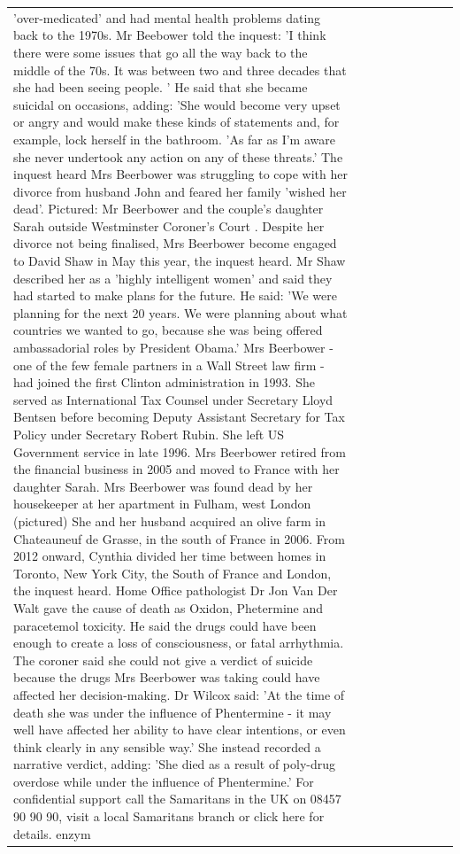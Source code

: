 \begin{table}[H]
\begin{tabular}{lllrlllll}
'over-medicated' and had mental health problems dating back to the 1970s. Mr Beebower told the inquest: 'I think there were some issues that go all the way back to the middle of the 70s. It was between two and three decades that she had been seeing people. ' He said that she became suicidal on occasions, adding: 'She would become very upset or angry and would make these kinds of statements and, for example, lock herself in the bathroom. 'As far as I'm aware she never undertook any action on any of these threats.' The inquest heard Mrs Beerbower was struggling to cope with her divorce from husband John and feared her family 'wished her dead'. Pictured: Mr Beerbower and the couple's daughter Sarah outside Westminster Coroner's Court . Despite her divorce not being finalised, Mrs Beerbower become engaged to David Shaw in May this year, the inquest heard. Mr Shaw described her as a 'highly intelligent women' and said they had started to make plans for the future. He said: 'We were planning for the next 20 years. We were planning about what countries we wanted to go, because she was being offered ambassadorial roles by President Obama.' Mrs Beerbower - one of the few female partners in a Wall Street law firm - had joined the first Clinton administration in 1993. She served as International Tax Counsel under Secretary Lloyd Bentsen before becoming Deputy Assistant Secretary for Tax Policy under Secretary Robert Rubin. She left US Government service in late 1996. Mrs Beerbower retired from the financial business in 2005 and moved to France with her daughter Sarah. Mrs Beerbower was found dead by her housekeeper at her apartment in Fulham, west London (pictured) She and her husband acquired an olive farm in Chateauneuf de Grasse, in the south of France in 2006. From 2012 onward, Cynthia divided her time between homes in Toronto, New York City, the South of France and London, the inquest heard. Home Office pathologist Dr Jon Van Der Walt gave the cause of death as Oxidon, Phetermine and paracetemol toxicity. He said the drugs could have been enough to create a loss of consciousness, or fatal arrhythmia. The coroner said she could not give a verdict of suicide because the drugs Mrs Beerbower was taking could have affected her decision-making. Dr Wilcox said: 'At the time of death she was under the influence of Phentermine - it may well have affected her ability to have clear intentions, or even think clearly in any sensible way.' She instead recorded a narrative verdict, adding: 'She died as a result of poly-drug overdose while under the influence of Phentermine.' For confidential support call the Samaritans in the UK on 08457 90 90 90, visit a local Samaritans branch or click here for details. enzym \\

\end{tabular}
\end{table}
